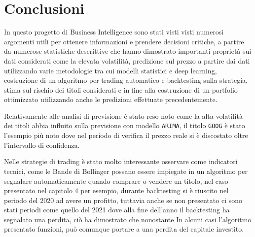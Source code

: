 
\section{Conclusioni}

In questo progetto di Business Intelligence sono stati visti visti numerosi argomenti utili per ottenere 
informazioni e prendere decisioni critiche, a partire da numerose statistiche descrittive che hanno
dimostrato importanti proprietà sui dati considerati come la elevata volatilità, predizione sul prezzo a partire
dai dati utilizzando varie metodologie tra cui modelli statistici e deep learning, costruzione di un algoritmo
per trading automatico e backtesting sulla strategia, stima sul rischio dei titoli considerati e in fine alla costruzione
di un portfolio ottimizzato utilizzando anche le predizioni effettuate precedentemente.

Relativamente alle analisi di previsione è stato reso noto come la alta volatilità dei titoli abbia influito sulla
previsione con modello \verb|ARIMA|, il titolo \verb|GOOG| è stato l'esempio più noto dove nel periodo di verifica il
prezzo reale si è discostato oltre l'intervallo di confidenza.

Nelle strategie di trading è stato molto interessante osservare come indicatori tecnici, come le Bande di Bollinger possano
essere impiegate in un algoritmo per segnalare automaticamente quando comprare o vendere un titolo, nel caso presentato nel capitolo
4 per esempio, durante backtesting si è riuscito nel periodo del 2020 ad avere un profitto, tuttavia anche se non presentato ci sono
stati periodi come quello del 2021 dove alla fine dell'anno il backtesting ha segnalato una perdita, ciò ha dimostrato che nonostante In
alcuni casi l'algoritmo presentato funzioni, può comunque portare a una perdita del capitale investito.

